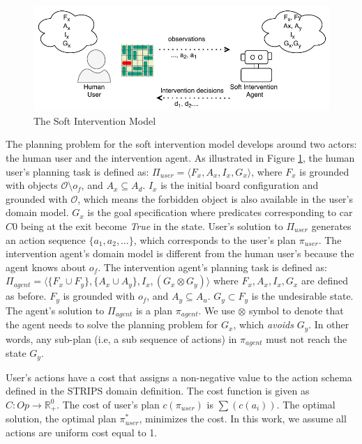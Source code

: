 \begin{figure}[!ht]
  \centering
\includegraphics{img/model.pdf}
  \caption{The Soft Intervention Model}
  \label{fig:model}
\end{figure}
The planning problem for the soft intervention model develops around two actors: the human user and the intervention agent. As illustrated in Figure \ref{fig:model}, the human user's planning task is defined as: $\Pi_{user}=\langle F_x, A_x, I_x, G_x\rangle$, where $F_x$ is grounded with objects $\mathcal{O}\setminus o_f$, and $A_x \subseteq A_d$. $I_x$ is the initial board configuration and grounded with $\mathcal{O}$, which means the forbidden object is also available in the user's domain model. $G_x$ is the goal specification where predicates corresponding to car $C0$ being at the exit become \textit{True} in the state. User's solution to $\Pi_{user}$ generates an action sequence $\lbrace a_1, a_2, \ldots \rbrace$, which corresponds to the user's plan $\pi_{user}$. The intervention agent's domain model is different from the human user's because the agent knows about $o_f$. The intervention agent's planning task is defined as: $\Pi_{agent}=\langle \lbrace F_x\cup F_y\rbrace, \lbrace A_x \cup A_y\rbrace, I_x, (G_x\otimes G_y)\rangle$ where $F_x, A_x, I_x, G_x$ are defined as before. $F_y$ is grounded with $o_f$, and $A_y \subseteq A_u$. $G_y\subset F_y$ is the undesirable state. The agent's solution to $\Pi_{agent}$ is a plan $\pi_{agent}$. We use $\otimes$ symbol to denote that the agent needs to solve the planning problem for $G_x$, which \textit{avoids} $G_y$. In other words, any sub-plan (i.e, a sub sequence of actions) in $\pi_{agent}$ must not reach the state $G_y$.

User's actions have a cost that assigns a non-negative value to the action schema defined in the STRIPS domain definition. The cost function is given as $C: Op \rightarrow \mathbb{R}^0_+$. The cost of user's plan $c(\pi_{user})$ is  $\sum(c(a_i))$. The optimal solution, the optimal plan $\pi^*_{user}$, minimizes the cost. In this work, we assume all actions are uniform cost equal to 1.

